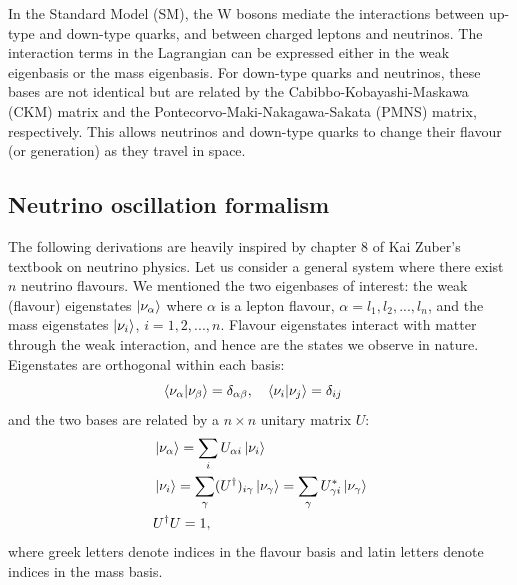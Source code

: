 In the Standard Model (SM), the W bosons mediate the interactions between up-type and
down-type quarks, and between charged leptons and neutrinos. The interaction
terms in the Lagrangian can be expressed either in the weak eigenbasis or the
mass eigenbasis\cite{langacker}. For down-type quarks and neutrinos, these
bases are not identical but are related by the Cabibbo-Kobayashi-Maskawa (CKM) matrix
and the Pontecorvo-Maki-Nakagawa-Sakata (PMNS) matrix\cite{zuber}, respectively.
This allows neutrinos and down-type quarks to change their flavour (or generation)
as they travel in space.


\subsection{Neutrino oscillation formalism} 
The following derivations are heavily inspired by chapter 8 of
Kai Zuber's textbook on neutrino physics\cite{zuber}.
Let us consider a general system where there exist $n$ neutrino flavours. 
We mentioned the two eigenbases of interest: the weak (flavour)
eigenstates $\ket{\nu_{\alpha}}$ where $\alpha$ is a lepton flavour,
$\alpha=l_1, l_2, ..., l_n$, and the mass eigenstates $\ket{\nu_i}$, $i=1, 2,
..., n$. 
Flavour eigenstates interact with matter through the weak interaction, and
hence are the states we observe in nature. Eigenstates are orthogonal within
each basis:
$$
\bra{\nu_\alpha}\ket{\nu_\beta} = \delta_{\alpha \beta}, \quad
	\bra{\nu_i}\ket{\nu_j} = \delta_{ij}  \quad
$$
and the two bases are related by a $n\times n$ unitary matrix $U$:
\begin{align}
	&\ket{\nu_\alpha} = \sum_i U_{\alpha i} \ket{\nu_i}\label{eq:bases1}\\
	&\ket{\nu_i} = \sum_\gamma (U^\dagger)_{i \gamma} \ket{\nu_\gamma} = \sum_\gamma
			U^*_{\gamma i} \ket{\nu_\gamma}\label{eq:bases2}\\
	&U^\dagger U = 1, \nonumber
\end{align}
where greek letters denote indices in the flavour basis and latin letters
denote indices in the mass basis.

